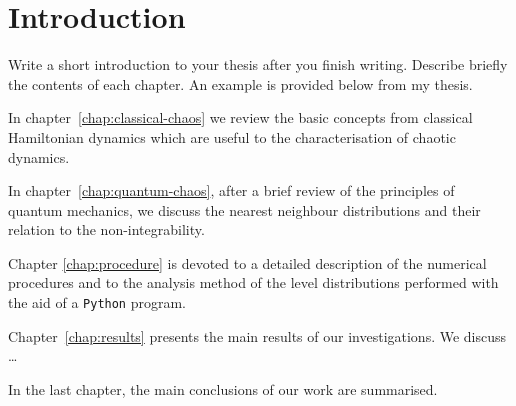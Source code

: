 \chapter*{Introduction}

Write a short introduction to your thesis after you finish writing.
Describe briefly the contents of each chapter. An example is
provided below from my thesis.

In chapter~\ref{chap:classical-chaos} we review the basic concepts from classical
Hamiltonian dynamics which are useful to the characterisation of chaotic dynamics.

In chapter~\ref{chap:quantum-chaos}, after a brief review of the principles of quantum mechanics,
we discuss the nearest neighbour distributions and their relation to the
non-integrability.

Chapter \ref{chap:procedure} is devoted to a detailed description of the numerical procedures
and to the analysis method of the level distributions performed with the aid of a
\texttt{Python} program.

Chapter~\ref{chap:results} presents the main results of our investigations.
We discuss \dots

In the last chapter, the main conclusions of our work are summarised.

